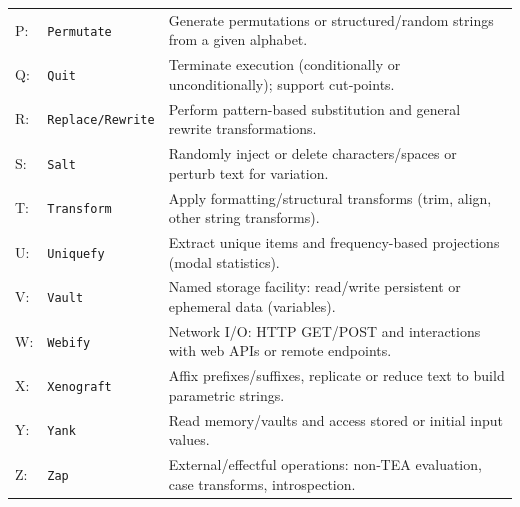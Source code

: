 \documentclass[sigplan,screen]{acmart}
\begin{document}
\begin{table}[ht]
\begin{tabular}{@{}p{} p{} p{}@{}}
    P: & \texttt{Permutate} & Generate permutations or structured/random strings from a given alphabet. \\
    Q: & \texttt{Quit} & Terminate execution (conditionally or unconditionally); support cut‑points. \\
    R: & \texttt{Replace/Rewrite} & Perform pattern-based substitution and general rewrite transformations. \\
    S: & \texttt{Salt} & Randomly inject or delete characters/spaces or perturb text for variation. \\
    T: & \texttt{Transform} & Apply formatting/structural transforms (trim, align, other string transforms). \\
    U: & \texttt{Uniquefy} & Extract unique items and frequency-based projections (modal statistics). \\
    V: & \texttt{Vault} & Named storage facility: read/write persistent or ephemeral data (variables). \\
    W: & \texttt{Webify} & Network I/O: HTTP GET/POST and interactions with web APIs or remote endpoints. \\
    X: & \texttt{Xenograft} & Affix prefixes/suffixes, replicate or reduce text to build parametric strings. \\
    Y: & \texttt{Yank} & Read memory/vaults and access stored or initial input values. \\
    Z: & \texttt{Zap} & External/effectful operations: non‑TEA evaluation, case transforms, introspection. \\
    \bottomrule
  \end{tabular}
\end{table}
\end{document}
